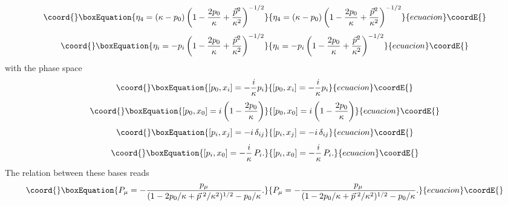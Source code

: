 \documentclass  [12pt] {article}
\begin{document}
\begin{equation}\coord{}\boxEquation{
 \eta_{4}=(\kappa-p_{0})\left(1-\frac{2p_{0}}{\kappa}+\frac{\vec{p}^{2}}
 {\kappa^{2}} \right)^{-1/2}
}{
 \eta_{4}=(\kappa-p_{0})\left(1-\frac{2p_{0}}{\kappa}+\frac{\vec{p}^{2}}
 {\kappa^{2}} \right)^{-1/2}
}{ecuacion}\coordE{}\end{equation}
\begin{equation}\coord{}\boxEquation{
 \eta_{i}=-p_{i}\left(1-\frac{2p_{0}}{\kappa}+\frac{\vec{p}^{2}}
 {\kappa^{2}} \right)^{-1/2}
}{
 \eta_{i}=-p_{i}\left(1-\frac{2p_{0}}{\kappa}+\frac{\vec{p}^{2}}
 {\kappa^{2}} \right)^{-1/2}
}{ecuacion}\coordE{}\end{equation}
with the phase space
\begin{equation}\coord{}\boxEquation{
 [p_0, x_i] =  -\frac{i}\kappa p_i
}{
 [p_0, x_i] =  -\frac{i}\kappa p_i
}{ecuacion}\coordE{}\end{equation}
\begin{equation}\coord{}\boxEquation{
 [p_0, x_0] = i\left(1 - \frac{2p_0}\kappa \right)
}{
 [p_0, x_0] = i\left(1 - \frac{2p_0}\kappa \right)
}{ecuacion}\coordE{}\end{equation}
\begin{equation}\coord{}\boxEquation{
  [p_i, x_j] = -i \, \delta_{ij}
}{
  [p_i, x_j] = -i \, \delta_{ij}
}{ecuacion}\coordE{}\end{equation}
\begin{equation}\coord{}\boxEquation{
 [p_i, x_0] = -\frac{i}\kappa\, P_i.
}{
 [p_i, x_0] = -\frac{i}\kappa\, P_i.
}{ecuacion}\coordE{}\end{equation}
The relation between these bases reads
\begin{equation}\coord{}\boxEquation{
 P_{\mu}=-\frac{p_{\mu}}{(1-2p_{0}/\kappa
 +\vec{p}^{\;2}/\kappa^2)^{1/2}-p_{0}/\kappa}.
}{
 P_{\mu}=-\frac{p_{\mu}}{(1-2p_{0}/\kappa
 +\vec{p}^{\;2}/\kappa^2)^{1/2}-p_{0}/\kappa}.
}{ecuacion}\coordE{}\end{equation}
\end{document}
